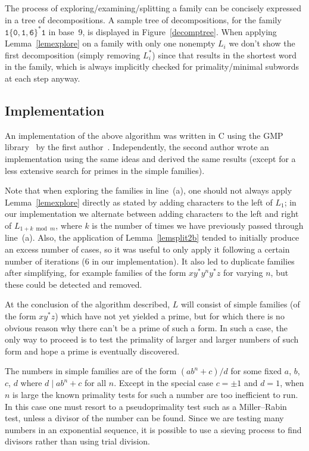 \documentclass[12pt]{article}
\theoremstyle{plain}
\theoremstyle{definition}
\theoremstyle{remark}
\newcommand{\0}{\mathtt{0}}
\newcommand{\1}{\mathtt{1}}
\newcommand{\2}{\mathtt{2}}
\newcommand{\3}{\mathtt{3}}
\newcommand{\4}{\mathtt{4}}
\newcommand{\5}{\mathtt{5}}
\newcommand{\6}{\mathtt{6}}
\newcommand{\7}{\mathtt{7}}
\newcommand{\8}{\mathtt{8}}
\newcommand{\9}{\mathtt{9}}
\begin{document}
The process of exploring/examining/splitting a family can be concisely expressed in a tree of decompositions.
A sample tree of decompositions, for the family $\1\{\0,\1,\6\}^*\1$ in base~9, is displayed in Figure~\ref{decomptree}.
When applying Lemma~\ref{lemexplore} on a family with only one nonempty $L_i$ we don't show the first decomposition
(simply removing $L_i^*$) since that results in the shortest word in the family, which is always implicitly
checked for primality/minimal subwords at each step anyway.

\subsection{Implementation}

An implementation of the above algorithm was written in C using the GMP library~\cite{gmp} by the first author~\cite{code}.
Independently, the second author wrote an implementation using the same ideas and derived the same results (except for
a less extensive search for primes in the simple families).

Note that when exploring the families in line~(a), one should not always apply Lemma~\ref{lemexplore} directly as stated by adding
characters to the left of $L_1$; in our implementation we alternate between adding characters
to the left and right of $L_{1+k\bmod m}$, where $k$ is the number of times we have previously passed through line~(a).
Also, the application of Lemma~\ref{lemsplit2b} tended to initially
produce an excess number of cases, so it was useful to only apply it following a certain number of iterations (6 in our implementation).
It also led to duplicate families after simplifying, for example families of the form $xy^*y^ny^*z$ for varying $n$,
but these could be detected and removed.

At the conclusion of the algorithm described, $L$ will consist of simple families (of the form $xy^*z$) which have not yet
yielded a prime, but for which there is no obvious reason why there can't be a prime of such a form.
In such a case, the only way to proceed is to test the primality of larger and larger numbers of such form and hope
a prime is eventually discovered.

The numbers in simple families are of the form $(ab^n+c)/d$ for some fixed $a$, $b$, $c$, $d$ where $d\mid ab^n+c$ for all $n$.
Except in the special case $c=\pm1$ and $d=1$, when $n$ is large the known primality tests for such a number are too inefficient to run.
In this case one must resort to a pseudoprimality test such as a Miller--Rabin test, unless a divisor of the number can be found.
Since we are testing many numbers in an exponential sequence, it is possible to use a sieving process to find divisors
rather than using trial division.
\end{document}
